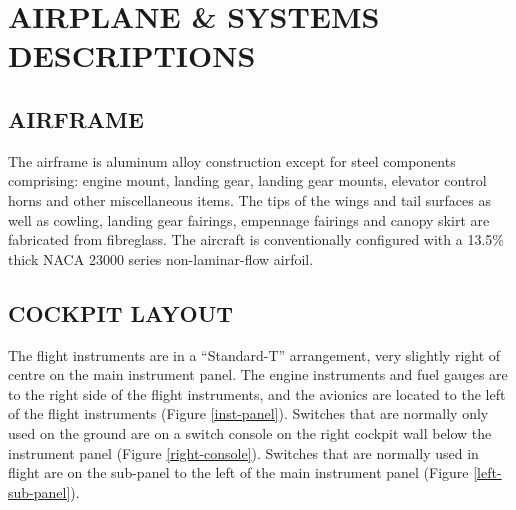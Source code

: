 \chapter{AIRPLANE \& SYSTEMS DESCRIPTIONS} \vspace{\minitocspacebefore} \minitoc

\cleardoublepage

\renewcommand{\textfraction}{0.1} 
\renewcommand{\topfraction}{.9} 
\renewcommand{\bottomfraction}{.9} 
\renewcommand{\floatpagefraction}{0.35} \setcounter{totalnumber}{5} 

\section{AIRFRAME}

The airframe is aluminum alloy construction except for steel components comprising: engine mount, landing gear, landing gear mounts, elevator control horns and other miscellaneous items. The tips of the wings and tail surfaces as well as cowling, landing gear fairings, empennage fairings and canopy skirt are fabricated from fibreglass. The aircraft is conventionally configured with a 13.5\% thick NACA 23000 series non-laminar-flow airfoil.

\section{COCKPIT LAYOUT}

The flight instruments are in a ``Standard-T'' arrangement, very slightly right of centre on the main instrument panel. The engine instruments and fuel gauges are to the right side of the flight instruments, and the avionics are located to the left of the flight instruments (Figure \ref{inst-panel}). Switches that are normally only used on the ground are on a switch console on the right cockpit wall below the instrument panel (Figure \ref{right-console}). Switches that are normally used in flight are on the sub-panel to the left of the main instrument panel (Figure \ref{left-sub-panel}).

